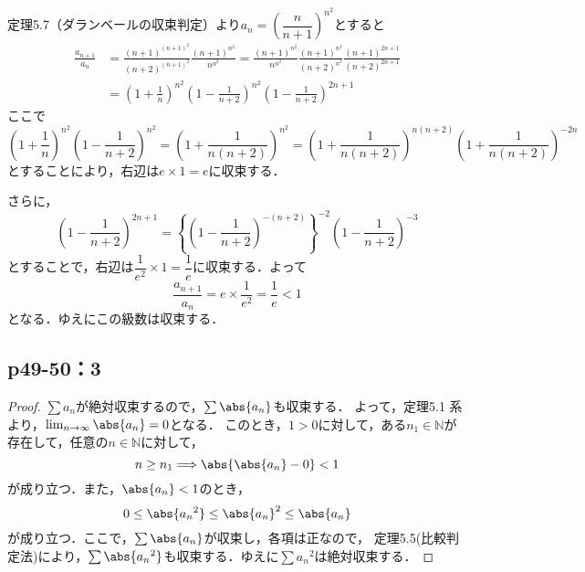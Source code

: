 \documentclass[uplatex,dvipdfmx,a4paper,10pt,fleqn]{jsarticle}
\begin{document}
        \begin{screen}
        定理5.7（ダランベールの収束判定）より$a_n=\left(\dfrac{n}{n+1}\right)^{n^2}$とすると
        \begin{align*}
        \frac{a_{n+1}}{a_n}&=\frac{(n+1)^{(n+1)^2}}{(n+2)^{(n+1)^2}}\frac{(n+1)^{n^2}}{n^{n^2}}=\frac{(n+1)^{n^2}}{n^{n^2}}\frac{(n+1)^{n^2}}{(n+2)^{n^2}}\frac{(n+1)^{2n+1}}{(n+2)^{2n+1}}\\
        &=\left(1+\frac{1}{n}\right)^{n^2}\left(1-\frac{1}{n+2}\right)^{n^2}\left(1-\frac{1}{n+2}\right)^{2n+1}
        \end{align*}
        ここで
        \[
        \left(1+\frac{1}{n}\right)^{n^2}\left(1-\frac{1}{n+2}\right)^{n^2}=\left(1+\frac{1}{n(n+2)}\right)^{n^2}=\left(1+\frac{1}{n(n+2)}\right)^{n(n+2)}\left(1+\frac{1}{n(n+2)}\right)^{-2n}
        \]
        とすることにより，右辺は$e \times 1=e$に収束する．
        
        さらに，
        \[
        \left(1-\frac{1}{n+2}\right)^{2n+1}=\left\{\left(1-\frac{1}{n+2}\right)^{-(n+2)}\right\}^{-2}\left(1-\frac{1}{n+2}\right)^{-3}
        \]
        とすることで，右辺は$\dfrac{1}{e^2} \times 1=\dfrac{1}{e}$に収束する．よって
        \[
        \frac{a_{n+1}}{a_n}=e \times \frac{1}{e^2}=\frac{1}{e}<1
        \]
        となる．ゆえにこの級数は収束する．
    \end{screen}


    \subsection*{p49-50：3}

    \begin{tleftbar}
        \begin{proof}
            $\sum a_n $が絶対収束するので，$\sum \abs{a_n}$も収束する．
            よって，定理5.1 系より，$\lim_{n \to \infty} \abs{a_n} =0$となる．
            このとき，$1>0$に対して，ある$n_1 \in \mathbb{N}$が存在して，任意の$n \in \mathbb{N}$に対して，
            \[
                n \ge n_1 \Longrightarrow \abs{\abs{a_n} -0}<1
            \]
            が成り立つ．また，$\abs{a_n}<1$のとき，
            \[
                0 \le \abs{{a_n}^2} \le {\abs{a_n}}^2 \le \abs{a_n}
            \]
            が成り立つ．ここで，$\sum \abs{a_n}$が収束し，各項は正なので， 定理5.5(比較判定法)により，$\sum \abs{{a_n}^2}$も収束する．ゆえに$\sum {a_n}^2$は絶対収束する．
        \end{proof}
    \end{tleftbar}
\end{document}
